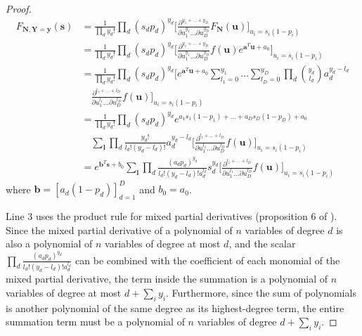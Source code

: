\documentclass{article}
\begin{document}
\begin{proof}

\begin{align*}
F_{\mathbf{N}, \mathbf{Y} = \mathbf{y}}(\mathbf{s})
&= \frac{1}{\prod_d y_d!} \prod_d (s_dp_d)^{y_d} \bigg[ \frac{\partial^{y_1+\ldots+y_D}}{\partial u_1^{y_1} \ldots \partial u_D^{y_D}} F_{\mathbf{N}}(\mathbf{u}) \bigg]_{u_i = s_i(1-p_i)} \\
&= \frac{1}{\prod_d y_d!} \prod_d (s_dp_d)^{y_d} \bigg[ \frac{\partial^{y_1+\ldots+y_D}}{\partial u_1^{y_1} \ldots \partial u_D^{y_D}} f(\mathbf{u}) e^{\mathbf{a}^T \mathbf{u} + a_0} \bigg]_{u_i = s_i(1-p_i)} \\
&= \frac{1}{\prod_d y_d!} \prod_d (s_dp_d)^{y_d} \bigg[ e^{\mathbf{a}^T \mathbf{u} + a_0} \sum_{l_1=0}^{y_1} \ldots \sum_{l_D=0}^{y_D} \prod_d {y_d \choose l_d} a_d^{y_d - l_d} \\
& \quad \frac{\partial^{l_1+\ldots+l_D}}{\partial u_1^{l_1} \ldots \partial u_D^{l_D}} f(\mathbf{u}) \bigg]_{u_i = s_i(1-p_i)} \\
&= \frac{1}{\prod_d y_d!} \prod_d (s_dp_d)^{y_d} e^{a_1 s_1 (1-p_1) + \ldots + a_D s_D (1-p_D) + a_0} \\
& \quad \sum_{\mathbf{l}} \prod_d \frac{y_d!}{l_d! (y_d - l_d)!} a_d^{y_d - l_d} \bigg[ \frac{\partial^{l_1+\ldots+l_D}}{\partial u_1^{l_1} \ldots \partial u_D^{l_D}} f(\mathbf{u}) \bigg]_{u_i = s_i(1-p_i)} \\
&= e^{\mathbf{b}^T \mathbf{s} + b_0} \sum_{\mathbf{l}} \prod_d \frac{(a_dp_d)^{y_d}}{l_d! (y_d - l_d)! a_d^{l_d}} s_d^{y_d} \bigg[ \frac{\partial^{l_1+\ldots+l_D}}{\partial u_1^{l_1} \ldots \partial u_D^{l_D}} f(\mathbf{u}) \bigg]_{u_i = s_i(1-p_i)} 
\end{align*}
where $\mathbf{b} = [a_d(1-p_d)]_{d=1}^D$ and $b_0 = a_0$.

Line 3 uses the product rule for mixed partial derivatives (proposition 6 of \cite{hardy2006combinatorics}). Since the mixed partial derivative of a polynomial of $n$ variables of degree $d$ is also a polynomial of $n$ variables of degree at most $d$, and the scalar $\prod_d \frac{(a_dp_d)^{y_d}}{l_d! (y_d - l_d)! a_d^{l_d}}$ can be combined with the coefficient of each monomial of the mixed partial derivative, the term inside the summation is a polynomial of $n$ variables of degree at most $d + \sum_i y_i$. Furthermore, since the sum of polynomials is another polynomial of the same degree as its highest-degree term, the entire summation term must be a polynomial of $n$ variables of degree $d + \sum_i y_i$.

\end{proof}
\end{document}
